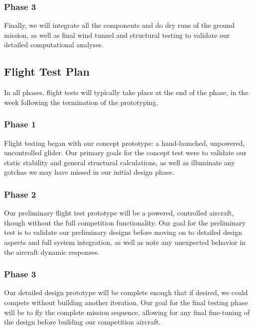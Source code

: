 \subsubsection{Phase 3} Finally, we will integrate all the components and do dry runs of the ground mission, as well as final wind tunnel and structural testing to validate our detailed computational analyses.





\subsection{Flight Test Plan}
\label{ssec:FlightTestingPlan}

In all phases, flight tests will typically take place at the end of the phase, in the week following the termination of the prototyping.

\subsubsection{Phase 1} Flight testing began with our concept prototype: a hand-launched, unpowered, uncontrolled glider.  Our primary goals for the concept test were to validate our static stability and general structural calculations, as well as illuminate any gotchas we may have missed in our initial design phase.

\subsubsection{Phase 2} Our preliminary flight test prototype will be a powered, controlled aircraft, though without the full competition functionality.  Our goal for the preliminary test is to validate our preliminary designs before moving on to detailed design aspects and full system integration, as well as note any unexpected behavior in the aircraft dynamic responses. 

\subsubsection{Phase 3} Our detailed design prototype will be complete enough that if desired, we could compete without building another iteration. Our goal for the final testing phase will be to fly the complete mission sequence, allowing for any final fine-tuning of the design before building our competition aircraft.
